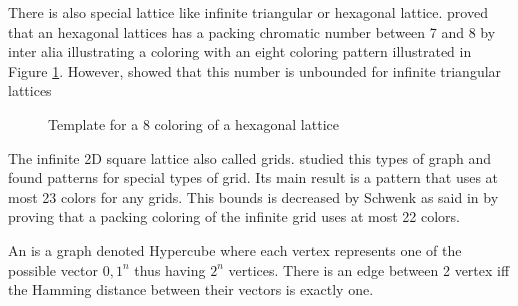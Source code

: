 There is also special lattice like infinite triangular or hexagonal lattice. \cite{PCNLatice} proved that an hexagonal lattices has a packing chromatic number between 7 and 8 by inter alia illustrating a coloring with an eight coloring pattern illustrated in Figure \ref{fig:hexagonalLattice}. However, \cite{Lattice}  showed that this number is unbounded for infinite triangular lattices\\


\begin{figure}
\centering
{}
\caption{Template for a 8 coloring of a hexagonal lattice}
\label{fig:hexagonalLattice}
\end{figure}


The infinite 2D square lattice also called grids. \cite{broadcastchromatic} studied this types of graph and found patterns for special types of grid. Its main result is a pattern that uses at most 23 colors for any grids. This bounds is decreased by Schwenk as said in \cite{broadcastchromatic} by proving that a packing coloring of the infinite grid uses at most 22 colors.

\begin{mydef}
An  is a graph denoted \gls{Hypercube} where each vertex represents one of the possible vector ${0,1}^n$ thus having $2^n$ vertices. There is an edge between 2 vertex iff the Hamming distance between their vectors is exactly one.
\end{mydef}

